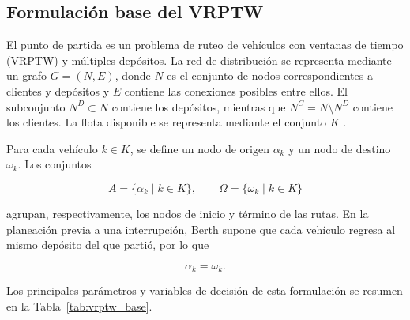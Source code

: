 \documentclass[11pt]{article}
\begin{document}
\subsection{Formulación base del VRPTW}

El punto de partida es un problema de ruteo de vehículos con ventanas de tiempo
(VRPTW) y múltiples depósitos. La red de distribución se representa mediante un
grafo \(G=(N,E)\), donde \(N\) es el conjunto de nodos correspondientes a clientes
y depósitos y \(E\) contiene las conexiones posibles entre ellos. El subconjunto
\(N^D\subset N\) contiene los depósitos, mientras que
\(N^C=N\setminus N^D\) contiene los clientes. La flota disponible se representa
mediante el conjunto \(K\) \parencite{berth_thesis_2025}.

Para cada vehículo \(k\in K\), se define un nodo de origen \(\alpha_k\) y un nodo
de destino \(\omega_k\). Los conjuntos

\[
A=\{\alpha_k\mid k\in K\},
\qquad
\Omega=\{\omega_k\mid k\in K\}
\]

agrupan, respectivamente, los nodos de inicio y término de las rutas. En la
planeación previa a una interrupción, Berth supone que cada vehículo regresa al
mismo depósito del que partió, por lo que

\[
\alpha_k=\omega_k.
\]

Los principales parámetros y variables de decisión de esta formulación se resumen en
la Tabla~\ref{tab:vrptw_base}.
\end{document}

